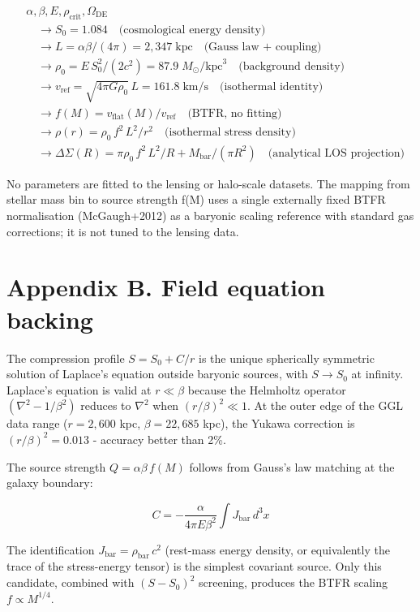 \documentclass[11pt,a4paper]{article}
\begin{document}
\[
\begin{aligned}
&\alpha, \beta, E, \rho_{\mathrm{crit}}, \Omega_{\mathrm{DE}} \\
&\quad\rightarrow S_0 = 1.084 \quad\text{(cosmological energy density)} \\
&\quad\rightarrow L = \alpha\beta/(4\pi) = 2{,}347\;\text{kpc} \quad\text{(Gauss law + coupling)} \\
&\quad\rightarrow \rho_0 = E\,S_0^2/(2c^2) = 87.9\;M_\odot/\text{kpc}^3 \quad\text{(background density)} \\
&\quad\rightarrow v_{\mathrm{ref}} = \sqrt{4\pi G\rho_0}\,L = 161.8\;\text{km/s} \quad\text{(isothermal identity)} \\
&\quad\rightarrow f(M) = v_{\mathrm{flat}}(M)/v_{\mathrm{ref}} \quad\text{(BTFR, no fitting)} \\
&\quad\rightarrow \rho(r) = \rho_0\,f^2\,L^2/r^2 \quad\text{(isothermal stress density)} \\
&\quad\rightarrow \Delta\Sigma(R) = \pi\rho_0\,f^2\,L^2/R + M_{\mathrm{bar}}/(\pi R^2) \quad\text{(analytical LOS projection)}
\end{aligned}
\]

No parameters are fitted to the lensing or halo-scale datasets. The mapping from stellar mass bin to source strength f(M) uses a single externally fixed BTFR normalisation (McGaugh+2012) as a baryonic scaling reference with standard gas corrections; it is not tuned to the lensing data.

\section{Appendix B. Field equation backing}
\label{sec:appendix-b}
The compression profile \(S = S_0 + C/r\) is the unique spherically symmetric solution of Laplace's equation outside baryonic sources, with \(S \to S_0\) at infinity. Laplace's equation is valid at \(r \ll \beta\) because the Helmholtz operator \((\nabla^2 - 1/\beta^2)\) reduces to \(\nabla^2\) when \((r/\beta)^2 \ll 1\). At the outer edge of the GGL data range (\(r = 2{,}600\) kpc, \(\beta = 22{,}685\) kpc), the Yukawa correction is \((r/\beta)^2 = 0.013\)  -  accuracy better than 2\%.

The source strength \(Q = \alpha\beta\,f(M)\) follows from Gauss's law matching at the galaxy boundary:

\[ C = -\frac{\alpha}{4\pi E\beta^2}\int J_{\mathrm{bar}}\,d^3x \]

The identification \(J_{\mathrm{bar}} = \rho_{\mathrm{bar}}\,c^2\) (rest-mass energy density, or equivalently the trace of the stress-energy tensor) is the simplest covariant source. Only this candidate, combined with \((S - S_0)^2\) screening, produces the BTFR scaling \(f \propto M^{1/4}\).
\end{document}
